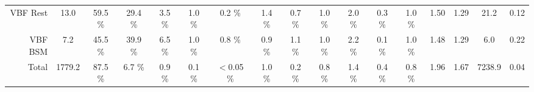 \begin{tabular}{ r | c | c | c  | c | c |  c |  c |  c |  c |  c |  c |  c |  c |  c |  c |  c }
 VBF Rest &  13.0  &  59.5 \%  &  29.4 \%  &  3.5 \%  &  1.0 \%  &  0.2 \%  &  1.4 \%  &  0.7 \%  &  1.0 \%  &  2.0 \%  &  0.3 \%  &  1.0 \%  & 1.50 & 1.29 & 21.2 & 0.12 \\
 VBF BSM &  7.2  &  45.5 \%  &  39.9 \%  &  6.5 \%  &  1.0 \%  &  0.8 \%  &  0.9 \%  &  1.1 \%  &  1.0 \%  &  2.2 \%  &  0.1 \%  &  1.0 \%  & 1.48 & 1.29 & 6.0 & 0.22 \\
Total &    1779.2  &  87.5 \%  &  6.7 \%  &  0.9 \%  &  0.1 \%  &  $<$0.05 \%  &  1.0 \%  &  0.2 \%  &  0.8 \%  &  1.4 \%  &  0.4 \%  &  0.8 \%  & 1.96 & 1.67 & 7238.9 & 0.04 \\
\hline
\end{tabular}
